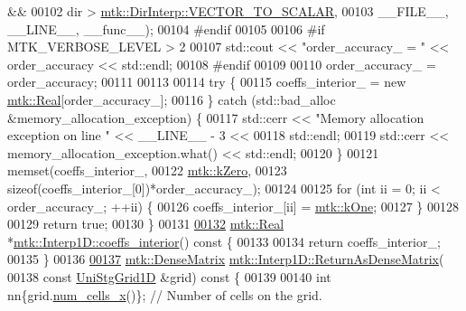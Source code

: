 \begin{DoxyCode}
       &&
00102                       dir > \hyperlink{namespacemtk_ga674ec67bd1baa04e5dc06c2bcc351972a6b389c8391a900c481d8c96c6045f468}{mtk::DirInterp::VECTOR\_TO\_SCALAR},
00103                       \_\_FILE\_\_, \_\_LINE\_\_, \_\_func\_\_);
00104 \textcolor{preprocessor}{  #endif}
00105 
00106 \textcolor{preprocessor}{  #if MTK\_VERBOSE\_LEVEL > 2}
00107   std::cout << \textcolor{stringliteral}{"order\_accuracy\_ = "} << order\_accuracy << std::endl;
00108 \textcolor{preprocessor}{  #endif}
00109 
00110   order\_accuracy\_ = order\_accuracy;
00111 
00113 
00114   \textcolor{keywordflow}{try} \{
00115     coeffs\_interior\_ = \textcolor{keyword}{new} \hyperlink{group__c01-roots_gac080bbbf5cbb5502c9f00405f894857d}{mtk::Real}[order\_accuracy\_];
00116   \} \textcolor{keywordflow}{catch} (std::bad\_alloc &memory\_allocation\_exception) \{
00117     std::cerr << \textcolor{stringliteral}{"Memory allocation exception on line "} << \_\_LINE\_\_ - 3 <<
00118       std::endl;
00119     std::cerr << memory\_allocation\_exception.what() << std::endl;
00120   \}
00121   memset(coeffs\_interior\_,
00122          \hyperlink{group__c01-roots_ga59a451a5fae30d59649bcda274fea271}{mtk::kZero},
00123          \textcolor{keyword}{sizeof}(coeffs\_interior\_[0])*order\_accuracy\_);
00124 
00125   \textcolor{keywordflow}{for} (\textcolor{keywordtype}{int} ii = 0; ii < order\_accuracy\_; ++ii) \{
00126     coeffs\_interior\_[ii] = \hyperlink{group__c01-roots_ga26407c24d43b6b95480943340d285c71}{mtk::kOne};
00127   \}
00128 
00129   \textcolor{keywordflow}{return} \textcolor{keyword}{true};
00130 \}
00131 
\hypertarget{mtk__interp__1d_8cc_source_l00132}{}\hyperlink{classmtk_1_1Interp1D_a652289cbb0000d3f4e5e8d632aaf4b03}{00132} \hyperlink{group__c01-roots_gac080bbbf5cbb5502c9f00405f894857d}{mtk::Real} *\hyperlink{classmtk_1_1Interp1D_a652289cbb0000d3f4e5e8d632aaf4b03}{mtk::Interp1D::coeffs\_interior}()\textcolor{keyword}{ const }\{
00133 
00134   \textcolor{keywordflow}{return} coeffs\_interior\_;
00135 \}
00136 
\hypertarget{mtk__interp__1d_8cc_source_l00137}{}\hyperlink{classmtk_1_1Interp1D_aee8126b8a4be378a30be4d95b43b384b}{00137} \hyperlink{classmtk_1_1DenseMatrix}{mtk::DenseMatrix} \hyperlink{classmtk_1_1Interp1D_aee8126b8a4be378a30be4d95b43b384b}{mtk::Interp1D::ReturnAsDenseMatrix}(
00138   \textcolor{keyword}{const} \hyperlink{classmtk_1_1UniStgGrid1D}{UniStgGrid1D} &grid)\textcolor{keyword}{ const }\{
00139 
00140   \textcolor{keywordtype}{int} nn\{grid.\hyperlink{classmtk_1_1UniStgGrid1D_af1b3729d8afa07be5b2775ed68015b80}{num\_cells\_x}()\}; \textcolor{comment}{// Number of cells on the grid.}

\end{DoxyCode}
